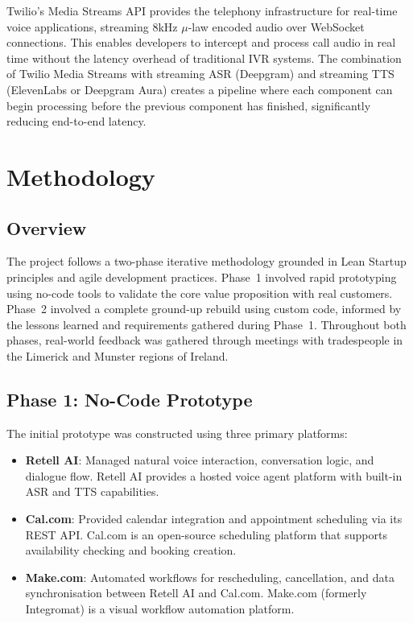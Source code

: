 \documentclass[conference]{IEEEtran}
\begin{document}
Twilio's Media Streams API \cite{b21} provides the telephony infrastructure for real-time voice applications, streaming 8kHz $\mu$-law encoded audio over WebSocket connections. This enables developers to intercept and process call audio in real time without the latency overhead of traditional IVR systems. The combination of Twilio Media Streams with streaming ASR (Deepgram) and streaming TTS (ElevenLabs or Deepgram Aura) creates a pipeline where each component can begin processing before the previous component has finished, significantly reducing end-to-end latency.


\section{Methodology}

\subsection{Overview}

The project follows a two-phase iterative methodology grounded in Lean Startup principles \cite{b18} and agile development practices. Phase~1 involved rapid prototyping using no-code tools to validate the core value proposition with real customers. Phase~2 involved a complete ground-up rebuild using custom code, informed by the lessons learned and requirements gathered during Phase~1. Throughout both phases, real-world feedback was gathered through meetings with tradespeople in the Limerick and Munster regions of Ireland.

\subsection{Phase 1: No-Code Prototype}

The initial prototype was constructed using three primary platforms:

\begin{itemize}
\item \textbf{Retell AI}: Managed natural voice interaction, conversation logic, and dialogue flow. Retell AI provides a hosted voice agent platform with built-in ASR and TTS capabilities.
\item \textbf{Cal.com}: Provided calendar integration and appointment scheduling via its REST API. Cal.com is an open-source scheduling platform that supports availability checking and booking creation.
\item \textbf{Make.com}: Automated workflows for rescheduling, cancellation, and data synchronisation between Retell AI and Cal.com. Make.com (formerly Integromat) is a visual workflow automation platform.
\end{itemize}
\end{document}
